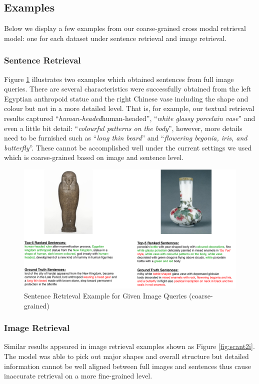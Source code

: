 \subsection{Examples}
Below we display a few examples from our coarse-grained cross modal retrieval model: one for each dataset under sentence retrieval and image retrieval.

\subsubsection{Sentence Retrieval}
Figure \ref{fig:scani2t} illustrates two examples which obtained sentences from full image queries. There are several characteristics were successfully obtained from the left Egyptian anthropoid statue and the right Chinese vase including the shape and colour but not in a more detailed level. That is, for example, our textual retrieval results captured ``\textit{human-headed}human-headed'', ``\textit{white glassy porcelain vase}'' and even a little bit detail: ``\textit{colourful patterns on the body}'', however, more details need to be furnished such as ``\textit{long thin beard}'' and ``\textit{flowering begonia, iris, and butterfly}''. These cannot be accomplished well under the current settings we used which is coarse-grained based on image and sentence level.

\begin{figure}[h!]
\centering
\includegraphics[width=\textwidth]{scani2t.pdf}
\caption{Sentence Retrieval Example for Given Image Queries (coarse-grained)}
\label{fig:scani2t}
\end{figure}

\subsubsection{Image Retrieval}
Similar results appeared in image retrieval examples shown as Figure \ref{fig:scant2i}. The model was able to pick out major shapes and overall structure but detailed information cannot be well aligned between full images and sentences thus cause inaccurate retrieval on a more fine-grained level.

